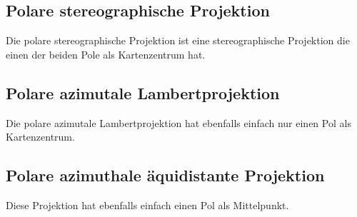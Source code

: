 \subsection{Polare stereographische Projektion}
\label{sec:polstere}
Die polare stereographische  Projektion ist eine stereographische Projektion die einen der beiden Pole als Kartenzentrum hat.\\
\subsection{Polare azimutale Lambertprojektion}
\label{sec:pollam}
Die polare  azimutale Lambertprojektion hat ebenfalls einfach nur einen Pol als Kartenzentrum.
\subsection{Polare azimuthale äquidistante Projektion}
\label{sec:polaequi}
Diese Projektion hat ebenfalls einfach einen Pol als Mittelpunkt. 
